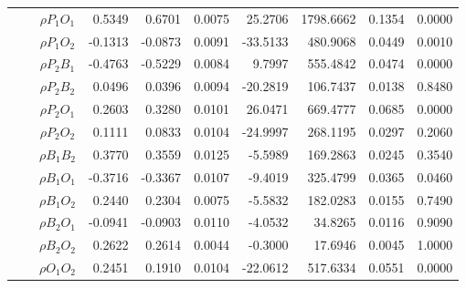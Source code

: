 \documentclass[letterpaper]{article}
\begin{document}
\begin{table}[h]
\begin{tabular}{cccrrrrrrr}
            &             & $\rho{P_1O_1}$ & 0.5349                 & 0.6701                 & 0.0075                 & 25.2706                & 1798.6662              & 0.1354                   & 0.0000                 \\
            &             & $\rho{P_1O_2}$ & -0.1313                & -0.0873                & 0.0091                 & -33.5133               & 480.9068               & 0.0449                   & 0.0010                 \\
            &             & $\rho{P_2B_1}$ & -0.4763                & -0.5229                & 0.0084                 & 9.7997                 & 555.4842               & 0.0474                   & 0.0000                 \\
            &             & $\rho{P_2B_2}$ & 0.0496                 & 0.0396                 & 0.0094                 & -20.2819               & 106.7437               & 0.0138                   & 0.8480                 \\
            &             & $\rho{P_2O_1}$ & 0.2603                 & 0.3280                 & 0.0101                 & 26.0471                & 669.4777               & 0.0685                   & 0.0000                 \\
            &             & $\rho{P_2O_2}$ & 0.1111                 & 0.0833                 & 0.0104                 & -24.9997               & 268.1195               & 0.0297                   & 0.2060                 \\
            &             & $\rho{B_1B_2}$ & 0.3770                 & 0.3559                 & 0.0125                 & -5.5989                & 169.2863               & 0.0245                   & 0.3540                 \\
            &             & $\rho{B_1O_1}$ & -0.3716                & -0.3367                & 0.0107                 & -9.4019                & 325.4799               & 0.0365                   & 0.0460                 \\
            &             & $\rho{B_1O_2}$ & 0.2440                 & 0.2304                 & 0.0075                 & -5.5832                & 182.0283               & 0.0155                   & 0.7490                 \\
            &             & $\rho{B_2O_1}$ & -0.0941                & -0.0903                & 0.0110                 & -4.0532                & 34.8265                & 0.0116                   & 0.9090                 \\
            &             & $\rho{B_2O_2}$ & 0.2622                 & 0.2614                 & 0.0044                 & -0.3000                & 17.6946                & 0.0045                   & 1.0000                 \\
            &             & $\rho{O_1O_2}$ & 0.2451                 & 0.1910                 & 0.0104                 & -22.0612               & 517.6334               & 0.0551                   & 0.0000                 \\\hline
\end{tabular}
\end{table}
\end{document}
